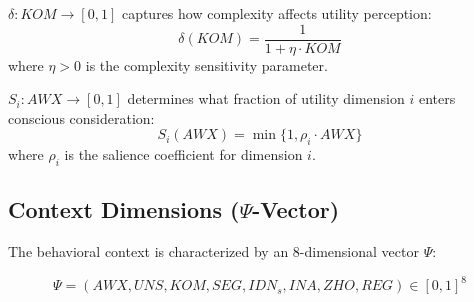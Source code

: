 \begin{definition}
\label{def:delta}
$\delta: KOM \rightarrow [0,1]$ captures how complexity affects utility perception:
\begin{equation}
\delta(KOM) = \frac{1}{1 + \eta \cdot KOM}
\end{equation}
where $\eta > 0$ is the complexity sensitivity parameter.
\end{definition}

\begin{definition}
\label{def:salience}
$S_i: AWX \rightarrow [0,1]$ determines what fraction of utility dimension $i$ enters conscious consideration:
\begin{equation}
S_i(AWX) = \min\{1, \rho_i \cdot AWX\}
\end{equation}
where $\rho_i$ is the salience coefficient for dimension $i$.
\end{definition}


\subsection{Context Dimensions ($\Psi$-Vector)}

The behavioral context is characterized by an 8-dimensional vector $\Psi$:

\begin{definition}
\label{def:psi}
\begin{equation}
\Psi = (AWX, UNS, KOM, SEG, IDN_s, INA, ZHO, REG) \in [0,1]^8
\end{equation}
\end{definition}


